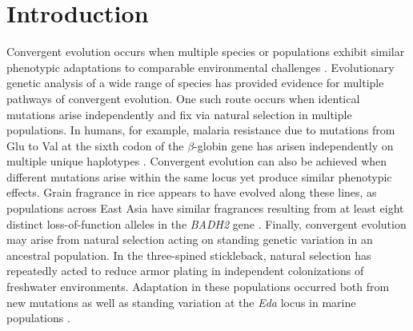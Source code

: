 \section*{Introduction}
\noindent Convergent evolution occurs when multiple species or populations exhibit similar phenotypic adaptations to comparable environmental challenges \cite[]{Wood_2005_15881688,Arendt_2008_18022278,Elmer_2011_21459472}.
Evolutionary genetic analysis of a wide range of species has provided evidence for multiple pathways of convergent evolution. 
One such route occurs when identical mutations arise independently and fix via natural selection in multiple populations. 
In humans, for example, malaria resistance due to mutations from Glu to Val at the sixth codon of the $\beta$-globin gene has arisen independently on multiple unique haplotypes  \cite[]{Currat_2002_11741197,Kwiatkowski_2005_16001361}.  
Convergent evolution can also be achieved when different mutations arise within the same locus yet produce similar phenotypic effects.  
Grain fragrance in rice appears to have evolved along these lines, as populations across East Asia have similar fragrances resulting from at least eight distinct loss-of-function alleles in the  \emph{BADH2} gene \cite[]{Kovach_2009_19706531}.  
Finally, convergent evolution may arise from natural selection acting on standing genetic variation in an ancestral population.  
In the three-spined stickleback, natural selection has repeatedly acted to reduce armor plating in independent colonizations of freshwater environments.  
Adaptation in these populations occurred both from new mutations as well as standing variation at the \emph{Eda} locus in marine populations \cite[]{Colosimo_2005_15790847}.  


